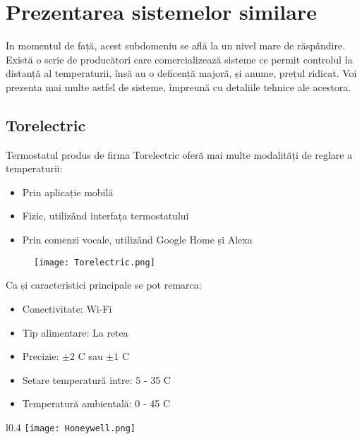 \chapter{Prezentarea sistemelor similare}\label{ch:2sistemeSimilare}

	In momentul de față, acest subdomeniu se află la un nivel mare de răspândire. Există o serie de producători care comercializează sisteme ce permit controlul la distanță al temperaturii, însă au o deficență majoră, și anume, prețul ridicat. Voi prezenta mai multe astfel de sisteme, împreună cu detaliile tehnice ale acestora. 	

\section{Torelectric}
	Termostatul produs de firma Torelectric oferă mai multe modalități de reglare a temperaturii:
	\begin{itemize}
  	\setlength{\itemindent}{2em}
		\item Prin aplicație mobilă
		\item Fizic, utilizând interfața termostatului
		\item Prin comenzi vocale, utilizând Google Home și Alexa
	\end{itemize}
	

	\begin{figure}[H]
    		\centering
    	\texttt{[image: Torelectric.png]}
	\end{figure}

	Ca și caracteristici principale se pot remarca:
	\begin{itemize}
	\setlength{\itemindent}{2em}
		\item Conectivitate: Wi-Fi
		\item Tip alimentare: La retea
		\item Precizie: $\pm 2$ \textdegree{}C sau $\pm 1$ \textdegree{}C
		\item Setare temperatură intre: 5 - 35 \textdegree{}C
		\item Temperatură ambientală: 0 - 45 \textdegree{}C
	\end{itemize}

\begin{wrapfigure}{l}{0.4\textwidth} 
\centering
\texttt{[image: Honeywell.png]}
\end{wrapfigure}
